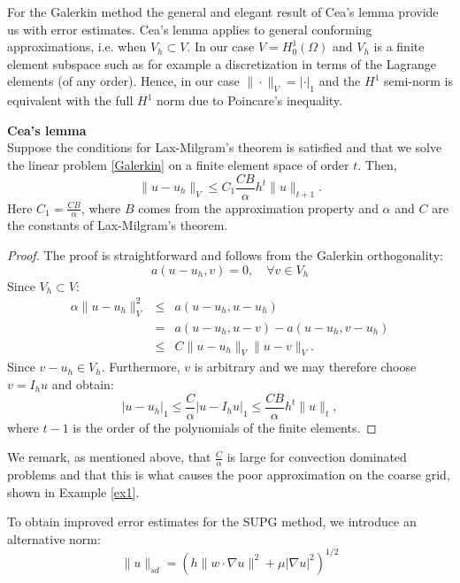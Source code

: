 For the Galerkin method the general and elegant result of Cea's lemma
provide us with error estimates. Cea's lemma applies to general 
conforming approximations, i.e. when $V_h \subset V$. In our
case $V=H_0^1(\Omega)$ and $V_h$ is a finite element subspace such 
as for example  a discretization in terms of the Lagrange elements (of any order). Hence, in our case 
$\|\cdot\|_V= |\cdot|_1$ and the $H^1$ semi-norm is equivalent with the full 
$H^1$ norm due to Poincare's inequality. 

\begin{theorem}{\textbf{Cea's lemma}} \\
Suppose the conditions for Lax-Milgram's theorem is satisfied and that
we solve the linear problem \eqref{Galerkin} on a finite element space
of order $t$. Then,     
\[
\|u-u_h\|_V     \le C_1 \frac{C B}{\alpha}  h^{t} \|u\|_{t+1}.   
\]
Here $C_1 = \frac{C B}{\alpha}$, where $B$ comes from the approximation property 
and $\alpha$ and $C$ are the constants of Lax-Milgram's theorem.    
\end{theorem}

\begin{proof}
The proof is straightforward and follows from the Galerkin orthogonality: 
\[
a(u - u_h, v) = 0, \quad \forall v \in V_h 
\]
Since $V_h \subset V$: 
\begin{eqnarray*}
\alpha \|u-u_h\|^2_{V} &\le& a(u-u_h, u-u_h)    \\ 
 &=& a(u-u_h, u-v) - a(u-u_h, v-u_h) \\ 
 &\le& C \|u-u_h\|_V \| u-v\|_V  .      
\end{eqnarray*}
Since $v-u_h\in V_h$. Furthermore,  $v$ is arbitrary and we may therefore choose $v = I_h u$ and obtain:  
\[
	|u-u_h|_1 \le \frac{C}{\alpha} |u - I_h u|_1 \le  \frac{CB}{\alpha} h^{t} \|u\|_t,   
\]
where $t-1$ is the order of the polynomials of the finite elements. 
\end{proof}

We remark, as mentioned above, that 
$\frac{C}{\alpha}$ is large for convection dominated problems and that this is what
causes the poor approximation on the coarse grid, shown in Example \ref{ex1}.  


To obtain improved error estimates for the SUPG method, we introduce  
an alternative norm: 
\begin{equation}
\label{supg:norm}
\|u\|_{sd} = \left(h\|w\cdot\nabla u\|^2 +  \mu |\nabla u|^2\right)^{1/2}
\end{equation}


